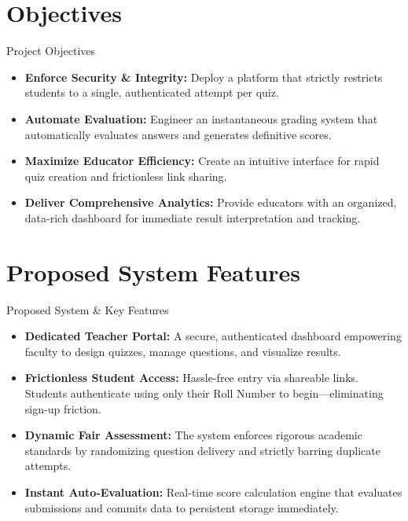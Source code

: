 \documentclass[aspectratio=169, 11pt]{beamer}
\begin{document}
\section{Objectives}
\begin{frame}{Project Objectives}
    \begin{itemize}
        \item \textbf{Enforce Security \& Integrity:} Deploy a platform that strictly restricts students to a single, authenticated attempt per quiz.
        \item \textbf{Automate Evaluation:} Engineer an instantaneous grading system that automatically evaluates answers and generates definitive scores.
        \item \textbf{Maximize Educator Efficiency:} Create an intuitive interface for rapid quiz creation and frictionless link sharing.
        \item \textbf{Deliver Comprehensive Analytics:} Provide educators with an organized, data-rich dashboard for immediate result interpretation and tracking.
    \end{itemize}
\end{frame}

\section{Proposed System Features}
\begin{frame}{Proposed System \& Key Features}
    \begin{itemize}
        \item \textbf{Dedicated Teacher Portal:} A secure, authenticated dashboard empowering faculty to design quizzes, manage questions, and visualize results.
        \item \textbf{Frictionless Student Access:} Hassle-free entry via shareable links. Students authenticate using only their Roll Number to begin—eliminating sign-up friction.
        \item \textbf{Dynamic Fair Assessment:} The system enforces rigorous academic standards by randomizing question delivery and strictly barring duplicate attempts.
        \item \textbf{Instant Auto-Evaluation:} Real-time score calculation engine that evaluates submissions and commits data to persistent storage immediately.
    \end{itemize}
\end{frame}
\end{document}
